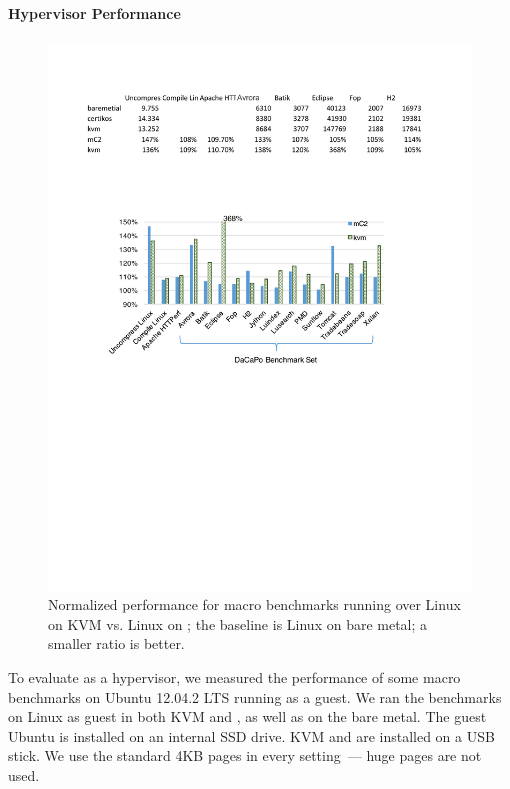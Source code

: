 \paragraph{Hypervisor Performance} 
\begin{figure}\centering
		\hspace{-.2cm}
		\includegraphics[width=13cm]{figs/hyp_macro.pdf}
		\hspace{-.2cm}
		\caption{Normalized performance for
                         macro benchmarks running over Linux on KVM
                         vs. Linux on \cCTOS; the baseline is
                         Linux on bare metal;
                         a smaller ratio is better.}
		\label{fig:eval_macro}
\end{figure}

To evaluate \cCTOS{} as a hypervisor, we measured the performance of some macro
benchmarks on Ubuntu 12.04.2 LTS running as a guest.  We ran the benchmarks on
Linux as guest in both KVM and \cCTOS{}, as well as on the bare metal. The guest
Ubuntu is installed on an internal SSD drive. KVM and \cCTOS{} are installed
on a USB stick. We use the standard 4KB pages in every setting~--- huge pages are not used.


